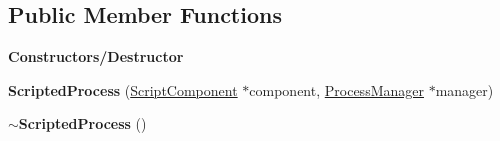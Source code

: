 \subsection*{Public Member Functions}
\begin{Indent}\textbf{ Constructors/\+Destructor}\par
\begin{DoxyCompactItemize}
\item 
\mbox{\label{classrev_1_1_scripted_process_aa0876644fd80e9a8f764b4867008d03f}} 
{\bfseries Scripted\+Process} (\mbox{\hyperlink{classrev_1_1_script_component}{Script\+Component}} $\ast$component, \mbox{\hyperlink{classrev_1_1_process_manager}{Process\+Manager}} $\ast$manager)
\item 
\mbox{\label{classrev_1_1_scripted_process_a0f830a3c90092a2c189f65b5918550aa}} 
{\bfseries $\sim$\+Scripted\+Process} ()
\end{DoxyCompactItemize}
\end{Indent}
